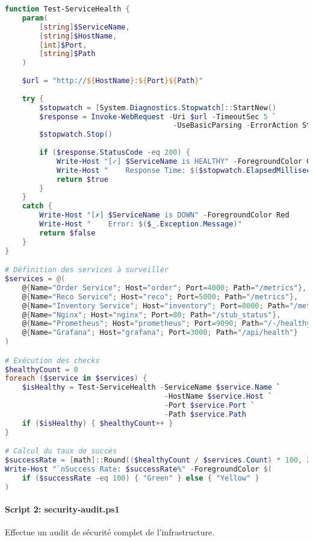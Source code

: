 \begin{lstlisting}[language=PowerShell, caption=Fonction de Health Check, basicstyle=\ttfamily\tiny]
function Test-ServiceHealth {
    param(
        [string]$ServiceName,
        [string]$HostName,
        [int]$Port,
        [string]$Path
    )
    
    $url = "http://${HostName}:${Port}${Path}"
    
    try {
        $stopwatch = [System.Diagnostics.Stopwatch]::StartNew()
        $response = Invoke-WebRequest -Uri $url -TimeoutSec 5 `
                                       -UseBasicParsing -ErrorAction Stop
        $stopwatch.Stop()
        
        if ($response.StatusCode -eq 200) {
            Write-Host "[✓] $ServiceName is HEALTHY" -ForegroundColor Green
            Write-Host "    Response Time: $($stopwatch.ElapsedMilliseconds)ms"
            return $true
        }
    }
    catch {
        Write-Host "[✗] $ServiceName is DOWN" -ForegroundColor Red
        Write-Host "    Error: $($_.Exception.Message)"
        return $false
    }
}

# Définition des services à surveiller
$services = @(
    @{Name="Order Service"; Host="order"; Port=4000; Path="/metrics"},
    @{Name="Reco Service"; Host="reco"; Port=5000; Path="/metrics"},
    @{Name="Inventory Service"; Host="inventory"; Port=8000; Path="/metrics"},
    @{Name="Nginx"; Host="nginx"; Port=80; Path="/stub_status"},
    @{Name="Prometheus"; Host="prometheus"; Port=9090; Path="/-/healthy"},
    @{Name="Grafana"; Host="grafana"; Port=3000; Path="/api/health"}
)

# Exécution des checks
$healthyCount = 0
foreach ($service in $services) {
    $isHealthy = Test-ServiceHealth -ServiceName $service.Name `
                                     -HostName $service.Host `
                                     -Port $service.Port `
                                     -Path $service.Path
    if ($isHealthy) { $healthyCount++ }
}

# Calcul du taux de succès
$successRate = [math]::Round(($healthyCount / $services.Count) * 100, 2)
Write-Host "`nSuccess Rate: $successRate%" -ForegroundColor $(
    if ($successRate -eq 100) { "Green" } else { "Yellow" }
)
\end{lstlisting}

\paragraph{Script 2: security-audit.ps1}
Effectue un audit de sécurité complet de l'infrastructure.

